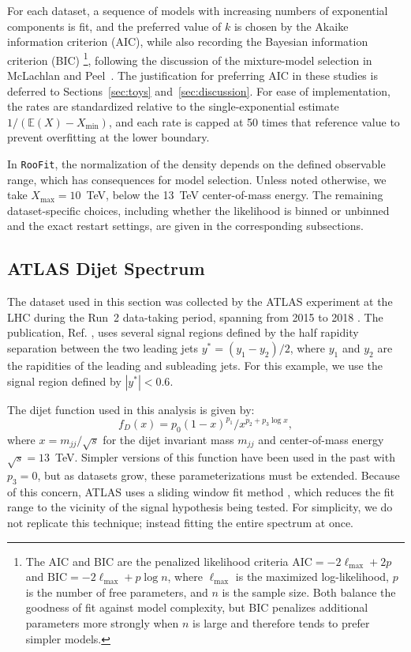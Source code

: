\documentclass[a4paper,11pt]{article}
\begin{document}
For each dataset, a sequence of models with increasing numbers of exponential components is fit, and the preferred value of $k$ is chosen by the Akaike information criterion (AIC), while also recording the Bayesian information criterion (BIC)
\footnote{The AIC and BIC are the penalized likelihood criteria $\mathrm{AIC}=-2\ell_{\max}+2p$ 
and $\mathrm{BIC}=-2\ell_{\max}+p\log n$, where $\ell_{\max}$ is the maximized log-likelihood, $p$ is the number of free parameters, and $n$ is the sample size. Both balance the goodness of fit against model complexity, but BIC penalizes additional parameters more strongly when $n$ is 
large and therefore tends to prefer simpler models.}, following the discussion of the mixture-model 
selection in McLachlan and Peel~\cite{finite-mixture-models}. The justification for preferring AIC in these studies is deferred to Sections~\ref{sec:toys} and~\ref{sec:discussion}. 
For ease of implementation, the rates are standardized relative to the single-exponential 
estimate $1/(\mathbb{E}(X)-X_{\min})$, and each rate is capped at 50 times that reference value to prevent overfitting at the lower 
boundary.

In \texttt{RooFit}, the normalization of the density depends on the defined observable range, which has consequences for model selection. Unless noted otherwise, we take $X_{\max}=10$~TeV, below the 13~TeV center-of-mass energy.
The remaining dataset-specific choices, including whether the likelihood is binned or unbinned and the exact restart settings, are given in the corresponding subsections.

\subsection{ATLAS Dijet Spectrum} \label{sec:example1}

The dataset used in this section was collected by the ATLAS experiment at the LHC during the 
Run~2 data-taking period, spanning from 2015 to 2018 .
The publication, Ref. \cite{ATLAS_dijet}, uses several signal regions defined by the half rapidity separation between the two leading jets $y^*= (y_1 - y_2)/2$, where $y_1$ and $y_2$ are the rapidities of the leading and subleading jets. For this example, we use the signal region defined by $|y^*|<0.6$. 

The dijet function used in this analysis is given by:
\begin{equation}
f_D(x) = p_0(1-x)^{p_1}/x^{p_2+p_3\log x},
\end{equation}
where $x=m_{jj}/\sqrt{s}$ for the dijet invariant mass $m_{jj}$ and center-of-mass energy 
$\sqrt{s}=13$~TeV.
Simpler versions of this function have been used in the past with $p_3=0$, but as datasets grow, these parameterizations must be extended. Because of this concern, ATLAS uses a sliding window fit method \cite{ATLAT_Dijet_sliding_window}, which reduces the fit range to the vicinity of the signal hypothesis being tested. For simplicity, we do not replicate this technique; instead fitting the entire spectrum at once.
\end{document}
